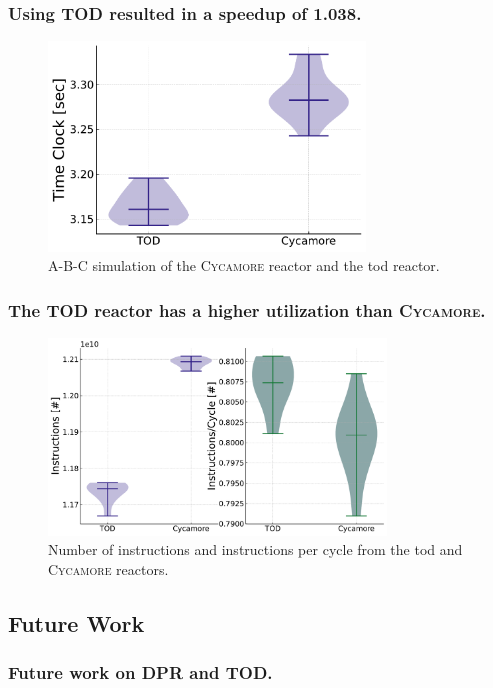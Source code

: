 \documentclass[9pt]{beamer}
\newcommand{\cycamore}{\textsc{Cycamore}\xspace}
\begin{document}
\begin{frame}
  \frametitle{Using TOD resulted in a speedup of 1.038.}
  \begin{figure}
    \centering
    \includegraphics[width=0.75\textwidth]{images/time_clock_violin.pdf}
    \caption{A-B-C simulation of the \cycamore reactor and the \gls{tod} reactor.}
  \end{figure}
\end{frame}

\begin{frame}
  \frametitle{The TOD reactor has a higher utilization than \cycamore.}
  \begin{figure}
    \centering
    \includegraphics[width=0.8\textwidth]{images/ins_cyc_both.pdf}
    \caption{Number of instructions and instructions per cycle from the \gls{tod} and \cycamore reactors.}
  \end{figure}
\end{frame}

\subsection{Future Work}
\begin{frame}
  \frametitle{Future work on DPR and TOD.}
\end{frame}
\end{document}
